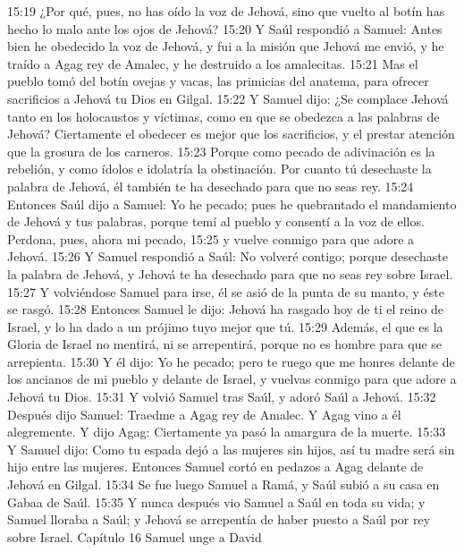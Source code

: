 15:19 ¿Por qué, pues, no has oído la voz de Jehová, sino que vuelto al botín has hecho lo malo ante los ojos de Jehová?  
15:20 Y Saúl respondió a Samuel: Antes bien he obedecido la voz de Jehová, y fui a la misión que Jehová me envió, y he traído a Agag rey de Amalec, y he destruido a los amalecitas.  
15:21 Mas el pueblo tomó del botín ovejas y vacas, las primicias del anatema, para ofrecer sacrificios a Jehová tu Dios en Gilgal.  
15:22 Y Samuel dijo: ¿Se complace Jehová tanto en los holocaustos y víctimas, como en que se obedezca a las palabras de Jehová? Ciertamente el obedecer es mejor que los sacrificios, y el prestar atención que la grosura de los carneros.  
15:23 Porque como pecado de adivinación es la rebelión, y como ídolos e idolatría la obstinación. Por cuanto tú desechaste la palabra de Jehová, él también te ha desechado para que no seas rey.  
15:24 Entonces Saúl dijo a Samuel: Yo he pecado; pues he quebrantado el mandamiento de Jehová y tus palabras, porque temí al pueblo y consentí a la voz de ellos. Perdona, pues, ahora mi pecado,  
15:25 y vuelve conmigo para que adore a Jehová.  
15:26 Y Samuel respondió a Saúl: No volveré contigo; porque desechaste la palabra de Jehová, y Jehová te ha desechado para que no seas rey sobre Israel.  
15:27 Y volviéndose Samuel para irse, él se asió de la punta de su manto, y éste se rasgó.  
15:28 Entonces Samuel le dijo: Jehová ha rasgado hoy de ti el reino de Israel, y lo ha dado a un prójimo tuyo mejor que tú.  
15:29 Además, el que es la Gloria de Israel no mentirá, ni se arrepentirá, porque no es hombre para que se arrepienta.  
15:30 Y él dijo: Yo he pecado; pero te ruego que me honres delante de los ancianos de mi pueblo y delante de Israel, y vuelvas conmigo para que adore a Jehová tu Dios.  
15:31 Y volvió Samuel tras Saúl, y adoró Saúl a Jehová.  
15:32 Después dijo Samuel: Traedme a Agag rey de Amalec. Y Agag vino a él alegremente. Y dijo Agag: Ciertamente ya pasó la amargura de la muerte.  
15:33 Y Samuel dijo: Como tu espada dejó a las mujeres sin hijos, así tu madre será sin hijo entre las mujeres. Entonces Samuel cortó en pedazos a Agag delante de Jehová en Gilgal.  
15:34 Se fue luego Samuel a Ramá, y Saúl subió a su casa en Gabaa de Saúl.  
15:35 Y nunca después vio Samuel a Saúl en toda su vida; y Samuel lloraba a Saúl; y Jehová se arrepentía de haber puesto a Saúl por rey sobre Israel.  
Capítulo 16
Samuel unge a David  

